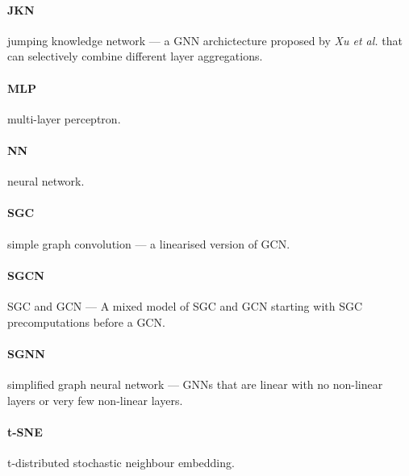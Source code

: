 \paragraph{JKN}
jumping knowledge network --- a GNN archictecture proposed by \textit{Xu et al.}\cite{xu2018representation} that can selectively combine different layer aggregations.

\paragraph{MLP}
multi-layer perceptron.

\paragraph{NN}
neural network.

\paragraph{SGC}
simple graph convolution --- a linearised version of GCN.

\paragraph{SGCN}
SGC and GCN --- A mixed model of SGC and GCN starting with SGC precomputations before a GCN.

\paragraph{SGNN}
simplified graph neural network --- GNNs that are linear with no non-linear layers or very few non-linear layers.

\paragraph{t-SNE}
t-distributed stochastic neighbour embedding.

